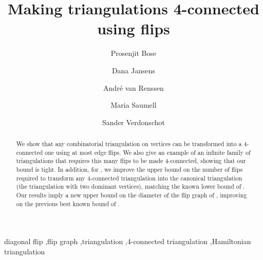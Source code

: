 \pdfoutput=1 \documentclass[12pt]{elsarticle}
\begin{document}
\begin{frontmatter}





\title{Making triangulations 4-connected using flips}


\author[carleton]{Prosenjit Bose}

\author[carleton]{Dana Jansens}

\author[carleton]{Andr\'e van Renssen}

\author[maria]{Maria Saumell}

\author[carleton]{Sander Verdonschot}

\address[carleton]{School of Computer Science, Carleton University, 5302 Herzberg Laboratories,\\
1125 Colonel By Drive, Ottawa, Ontario, K1S 5B6, Canada.}
\address[maria]{Computer Science Department, Universit\'e Libre de Bruxelles,\\
Boulevard du Triomphe - CP 212, 1050 Brussels, Belgium.}

\begin{abstract}
We show that any combinatorial triangulation on  vertices can be transformed into a 4-connected one using at most  edge flips. We also give an example of an infinite family of triangulations that requires this many flips to be made 4-connected, showing that our bound is tight. In addition, for , we improve the upper bound on the number of flips required to transform any 4-connected triangulation into the canonical triangulation (the triangulation with two dominant vertices), matching the known lower bound of . Our results imply a new upper bound on the diameter of the flip graph of , improving on the previous best known bound of .
\end{abstract}

\begin{keyword}
diagonal flip \sep flip graph \sep triangulation \sep 4-connected triangulation \sep Hamiltonian triangulation


\end{keyword}

\end{frontmatter}
\end{document}
